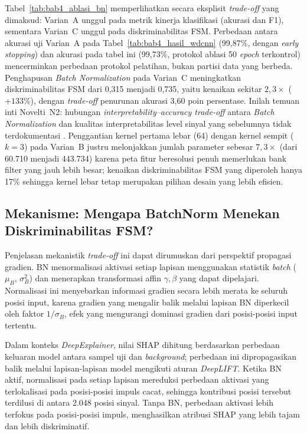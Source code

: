 Tabel~\ref{tab:bab4_ablasi_bn} memperlihatkan secara eksplisit
\emph{trade-off} yang dimaksud: Varian~A unggul pada metrik kinerja klasifikasi
(akurasi dan F1), sementara {\color{blue}Varian~C unggul pada
diskriminabilitas FSM}.
{\color{blue}Perbedaan antara akurasi uji Varian~A pada
Tabel~\ref{tab:bab4_hasil_wdcnn} (99,87\%, dengan \emph{early stopping}) dan
akurasi pada tabel ini (99,73\%, protokol ablasi 50 \emph{epoch} terkontrol)
mencerminkan perbedaan protokol pelatihan, bukan partisi data yang berbeda.}
{\color{blue}Penghapusan \emph{Batch Normalization} pada Varian~C
meningkatkan diskriminabilitas FSM dari 0,315 menjadi 0,735, yaitu kenaikan
sekitar $2{,}3\times$ ($+133\%$), dengan \emph{trade-off} penurunan akurasi
3,60 poin persentase. Inilah temuan inti Novelti~N2: hubungan
\emph{interpretability--accuracy trade-off} antara \emph{Batch Normalization}
dan kualitas interpretabilitas level sinyal yang sebelumnya tidak
terdokumentasi .}
{\color{blue}Penggantian kernel pertama lebar (64) dengan kernel sempit
($k=3$) pada Varian~B justru melonjakkan jumlah parameter sebesar
$7{,}3\times$ (dari 60.710 menjadi 443.734) karena peta fitur beresolusi
penuh memerlukan bank filter yang jauh lebih besar; kenaikan
diskriminabilitas FSM yang diperoleh hanya 17\% sehingga kernel lebar tetap
merupakan pilihan desain yang lebih efisien.}

\subsection{Mekanisme: Mengapa BatchNorm Menekan Diskriminabilitas FSM?}
\label{subsec:bab4_ablasi_mekanisme}

Penjelasan mekanistik \emph{trade-off} ini dapat dirumuskan dari perspektif
propagasi gradien.
BN menormalisasi aktivasi setiap lapisan menggunakan statistik \emph{batch}
($\mu_B$, $\sigma_B^2$) dan menerapkan transformasi affin $\gamma, \beta$
yang dapat dipelajari.
Normalisasi ini menyebarkan informasi gradien secara lebih merata ke seluruh
posisi input, karena gradien yang mengalir balik melalui lapisan BN
diperkecil oleh faktor $1/\sigma_B$, efek yang mengurangi dominasi
gradien dari posisi-posisi input tertentu.

Dalam konteks \emph{DeepExplainer}, nilai SHAP dihitung berdasarkan perbedaan
keluaran model antara sampel uji dan \emph{background}; perbedaan ini
dipropagasikan balik melalui lapisan-lapisan model mengikuti aturan
\emph{DeepLIFT}.
Ketika BN aktif, normalisasi pada setiap lapisan mereduksi perbedaan aktivasi
yang terlokalisasi pada posisi-posisi impuls cacat, sehingga kontribusi posisi
tersebut terdilusi di antara 2.048 posisi sinyal.
Tanpa BN, perbedaan aktivasi lebih terfokus pada posisi-posisi impuls,
menghasilkan atribusi SHAP yang lebih tajam dan lebih diskriminatif.

